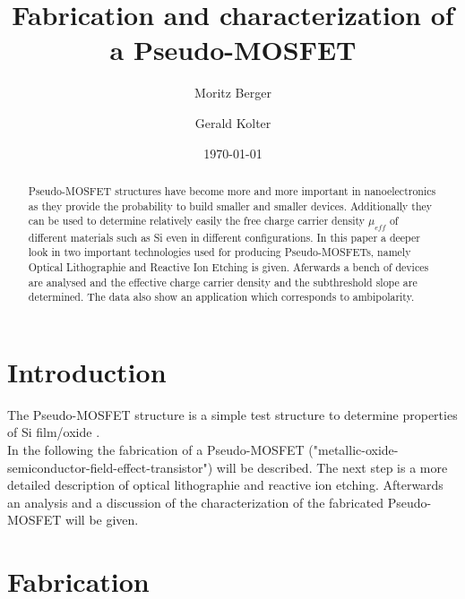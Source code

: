 \documentclass[%
 reprint,
amsmath,amssymb,
pra,
]{revtex4-1}
\begin{document}

\title{Fabrication and characterization of a Pseudo-MOSFET}%

\author{Moritz Berger}
 \author{Gerald Kolter}

\date{\today}%

\begin{abstract}
Pseudo-MOSFET structures have become more and more important in nanoelectronics as they provide the probability to build smaller and smaller devices. Additionally they can be used to determine relatively easily the free charge carrier density $\mu _{eff}$ of different materials such as Si even in different configurations. In this paper a deeper look in two important technologies used for producing Pseudo-MOSFETs, namely Optical Lithographie and Reactive Ion Etching is given. Aferwards a bench of devices are analysed and the effective charge carrier density and the subthreshold slope are determined. The data also show an application which corresponds to ambipolarity.
\end{abstract}

\maketitle


\section{Introduction}
The Pseudo-MOSFET structure is a simple test structure to determine properties of Si film/oxide \citep{Park}. \\
In the following the fabrication of a Pseudo-MOSFET ("metallic-oxide-semiconductor-field-effect-transistor") will be described. The next step is a more detailed description of optical lithographie and reactive ion etching. Afterwards an analysis and a discussion of the characterization of the fabricated Pseudo-MOSFET will be given.


\section{Fabrication}
\end{document}
